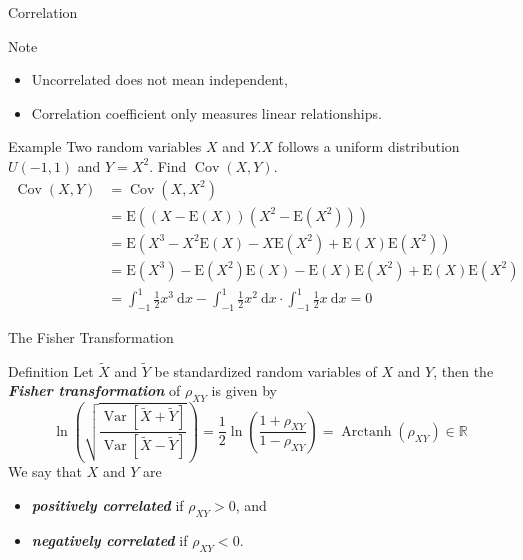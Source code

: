 \documentclass{beamer}
\newcommand{\bb}[1]{\textcolor{antiquefuchsia}{\textbf{\textit{#1}}}}
\begin{document}
\begin{frame}{Correlation}
\begin{block}{Note}
\begin{itemize}
\item Uncorrelated does not mean independent,
\item Correlation coefficient only measures linear relationships.
\end{itemize}
\end{block}
\begin{block}{Example}
Two random variables $X$ and $Y . X$ follows a uniform distribution $U(-1,1)$ and $Y=X^{2}$. Find $\operatorname{Cov}(X, Y)$.
$$
\begin{aligned}
\operatorname{Cov}(X, Y) &=\operatorname{Cov}\left(X, X^{2}\right) \\
&=\mathrm{E}\left((X-\mathrm{E}(X))\left(X^{2}-\mathrm{E}\left(X^{2}\right)\right)\right) \\
&=\mathrm{E}\left(X^{3}-X^{2} \mathrm{E}(X)-X \mathrm{E}\left(X^{2}\right)+\mathrm{E}(X) \mathrm{E}\left(X^{2}\right)\right) \\
&=\mathrm{E}\left(X^{3}\right)-\mathrm{E}\left(X^{2}\right) \mathrm{E}(X)-\mathrm{E}(X) \mathrm{E}\left(X^{2}\right)+\mathrm{E}(X) \mathrm{E}\left(X^{2}\right) \\
&=\int_{-1}^{1} \frac{1}{2} x^{3} \mathrm{~d} x-\int_{-1}^{1} \frac{1}{2} x^{2} \mathrm{~d} x \cdot \int_{-1}^{1} \frac{1}{2} x \mathrm{~d} x =0
\end{aligned}
$$
\end{block}
\end{frame}

\begin{frame}{The Fisher Transformation}
\begin{block}{Definition}
Let $\widetilde{X}$ and $\widetilde{Y}$ be standardized random variables of $X$ and $Y$, then the \bb{Fisher transformation} of $\rho_{X Y}$ is given by
$$\ln \left(\sqrt{\frac{\operatorname{Var}[\widetilde{X}+\widetilde{Y}]}{\operatorname{Var}[\widetilde{X}-\widetilde{Y}]}}\right)=\frac{1}{2} \ln \left(\frac{1+\rho_{X Y}}{1-\rho_{X Y}}\right)=\operatorname{Arctanh}\left(\rho_{X Y}\right) \in \mathbb{R}$$
We say that $X$ and $Y$ are
\begin{itemize}
\item \bb{positively correlated} if $\rho_{X Y}>0$, and
\item \bb{negatively correlated} if $\rho_{X Y}<0$.
\end{itemize}
\end{block}
\end{frame}
\end{document}

